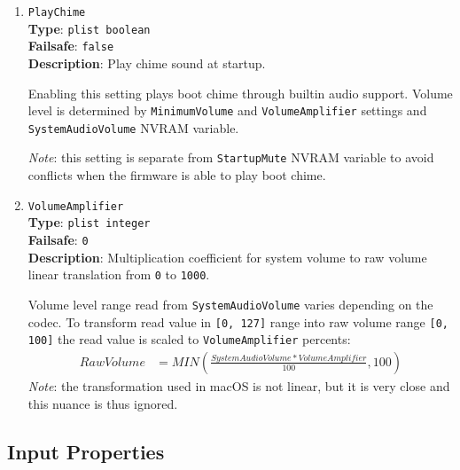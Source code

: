 \documentclass[]{article}
\begin{document}
\begin{enumerate}
\item
  \texttt{PlayChime}\\
  \textbf{Type}: \texttt{plist\ boolean}\\
  \textbf{Failsafe}: \texttt{false}\\
  \textbf{Description}: Play chime sound at startup.

  Enabling this setting plays boot chime through builtin audio support. Volume level
  is determined by \texttt{MinimumVolume} and \texttt{VolumeAmplifier} settings and
  \texttt{SystemAudioVolume} NVRAM variable.

  \emph{Note}: this setting is separate from \texttt{StartupMute} NVRAM variable
  to avoid conflicts when the firmware is able to play boot chime.

\item
  \texttt{VolumeAmplifier}\\
  \textbf{Type}: \texttt{plist\ integer}\\
  \textbf{Failsafe}: \texttt{0}\\
  \textbf{Description}: Multiplication coefficient for system volume to raw volume linear translation
  from \texttt{0} to \texttt{1000}.

  Volume level range read from \texttt{SystemAudioVolume} varies depending on the codec.
  To transform read value in \texttt{[0, 127]} range into raw volume range \texttt{[0, 100]}
  the read value is scaled to \texttt{VolumeAmplifier} percents:
  \begin{align*}
      RawVolume &= MIN(\frac{SystemAudioVolume * VolumeAmplifier}{100}, 100)
  \end{align*}
  \emph{Note}: the transformation used in macOS is not linear, but it is very close
  and this nuance is thus ignored.

\end{enumerate}

\subsection{Input Properties}\label{uefiinputprops}
\end{document}
